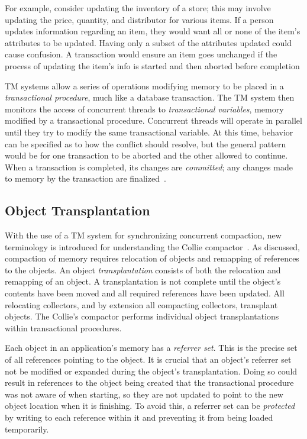 \documentclass{sig-alternate}
\begin{document}
For example, consider updating the inventory of a store; this may involve updating
the price, quantity, and distributor for various items. 
If a person updates information regarding an item, they would 
want all or none of the item's attributes to be updated. Having
only a subset of the attributes updated could cause confusion. A transaction
would ensure an item goes unchanged if the process of updating the item's info 
is started and then aborted before completion

TM systems allow a series
of operations modifying memory to be placed in
a \emph{transactional procedure}, much like a database transaction.
The TM system then monitors the access of concurrent threads to \emph{transactional variables},
memory modified by a transactional procedure.
Concurrent threads will operate in parallel until they try to modify
the same transactional variable. At this time, behavior can be specified as to how 
the conflict should resolve, but the general pattern would be for one transaction
to be aborted and the other allowed to continue.
When a transaction is completed, its changes are \emph{committed}; any changes 
made to memory by the transaction are finalized~\cite{wiki:transactional-memory}.


\subsection{Object Transplantation}
\label{sec:collieTransplantation}

With the use of a TM system for synchronizing concurrent compaction,
new terminology is introduced for understanding the Collie 
compactor~\cite{Iyengar:Collie}. As discussed, compaction of
memory requires relocation of objects and remapping of references to
the objects.
An object \emph{transplantation} consists of both the relocation and 
remapping of an object. A transplantation is not complete until
the object's contents have been moved and all required references have been
updated. All relocating collectors, and by extension all
compacting collectors, transplant objects. The Collie's compactor 
performs individual object transplantations within transactional procedures. 

Each object in an application's memory has a \emph{referrer set}. This is the precise set 
of all references pointing to the object. It is crucial that an object's referrer set not
be modified or expanded during the object's transplantation. Doing so could result
in references to the object being created that the transactional procedure
was not aware of when starting, so they are not updated to point to 
the new object location when it is finishing. To avoid this, a referrer set can be
\emph{protected} by writing to each reference within it and preventing it from
being loaded temporarily.
\end{document}
